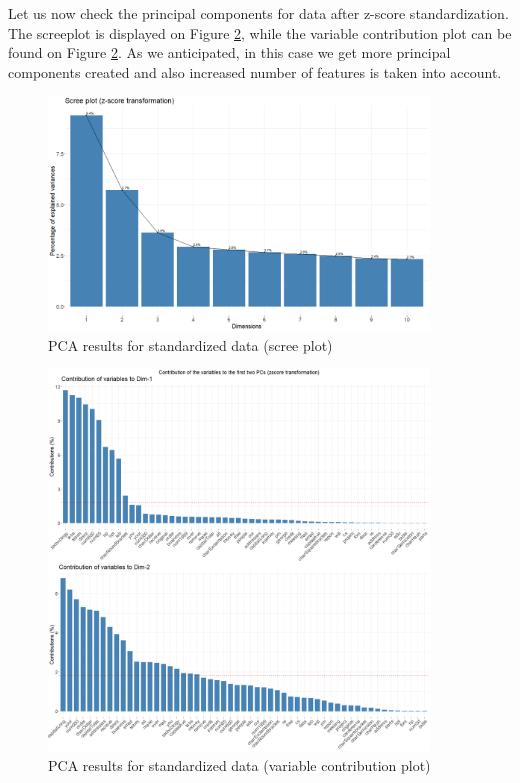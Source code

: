 \documentclass{article}
\begin{document}
	Let us now check the principal components for data after z-score standardization. The screeplot is displayed on Figure \ref{fig::varplot_zscore},
	while the variable contribution plot can be found on Figure \ref{fig::varplot_zscore}.
	As we anticipated, in this case we get more principal components created and also increased number of features is taken into account.

	\begin{figure}[h]
		\centering
		\includegraphics[width=0.9\textwidth]{proj2_plots/screeplot2.png}
		\caption{PCA results for standardized data (scree plot)}
		\label{fig::screeplot_zscore}
	\end{figure}
	
	\begin{figure}[h]
		\centering
		\includegraphics[width=0.9\textwidth]{proj2_plots/varplot2.png}
		\caption{PCA results for standardized data (variable contribution plot)}
		\label{fig::varplot_zscore}
	\end{figure}
	
\end{document}
